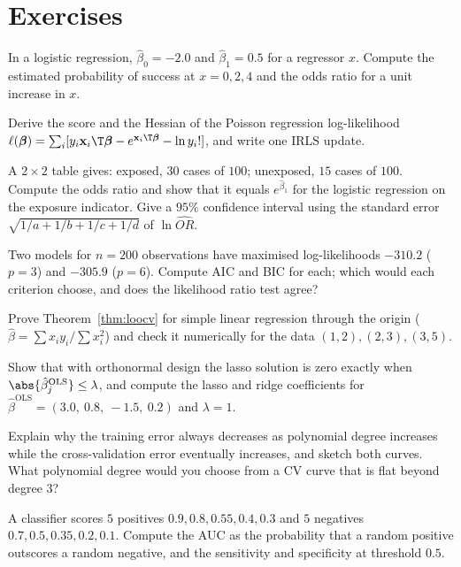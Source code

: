 \section{Exercises}

\begin{exercise}
In a logistic regression, $\hat\beta_0=-2.0$ and $\hat\beta_1=0.5$ for a regressor $x$. Compute the estimated probability of success at $x=0,2,4$ and the odds ratio for a unit increase in $x$.
\end{exercise}

\begin{exercise}
Derive the score and the Hessian of the Poisson regression log-likelihood $\ell(\boldsymbol\beta)=\sum_i[y_i\mathbf{x}_i\T\boldsymbol\beta-e^{\mathbf{x}_i\T\boldsymbol\beta}-\ln y_i!]$, and write one IRLS update.
\end{exercise}

\begin{exercise}
A $2\times2$ table gives: exposed, $30$ cases of $100$; unexposed, $15$ cases of $100$. Compute the odds ratio and show that it equals $e^{\hat\beta_1}$ for the logistic regression on the exposure indicator. Give a $95\%$ confidence interval using the standard error $\sqrt{1/a+1/b+1/c+1/d}$ of $\ln\widehat{OR}$.
\end{exercise}

\begin{exercise}
Two models for $n=200$ observations have maximised log-likelihoods $-310.2$ ($p=3$) and $-305.9$ ($p=6$). Compute AIC and BIC for each; which would each criterion choose, and does the likelihood ratio test agree?
\end{exercise}

\begin{exercise}
Prove Theorem~\ref{thm:loocv} for simple linear regression through the origin ($\hat\beta=\sum x_iy_i/\sum x_i^2$) and check it numerically for the data $(1,2),(2,3),(3,5)$.
\end{exercise}

\begin{exercise}
Show that with orthonormal design the lasso solution is zero exactly when $\abs{\hat\beta_j^{\mathrm{OLS}}}\le\lambda$, and compute the lasso and ridge coefficients for $\hat\beta^{\mathrm{OLS}}=(3.0,\ 0.8,\ -1.5,\ 0.2)$ and $\lambda=1$.
\end{exercise}

\begin{exercise}
Explain why the training error always decreases as polynomial degree increases while the cross-validation error eventually increases, and sketch both curves. What polynomial degree would you choose from a CV curve that is flat beyond degree $3$?
\end{exercise}

\begin{exercise}
A classifier scores $5$ positives $0.9,0.8,0.55,0.4,0.3$ and $5$ negatives $0.7,0.5,0.35,0.2,0.1$. Compute the AUC as the probability that a random positive outscores a random negative, and the sensitivity and specificity at threshold $0.5$.
\end{exercise}
